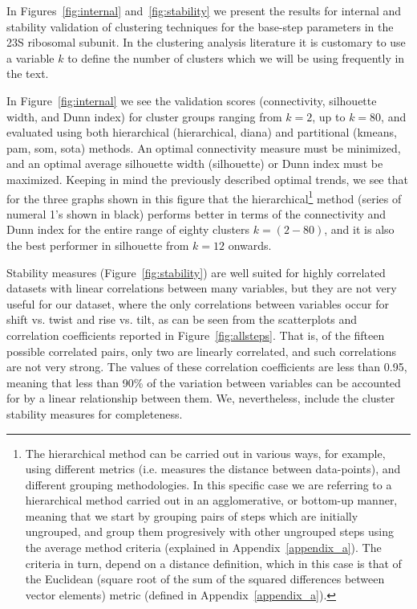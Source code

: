 In  Figures~\ref{fig:internal} and~\ref{fig:stability} we  present the
results for internal and stability validation of clustering techniques
for the  base-step parameters  in the 23S  ribosomal subunit.   In the
clustering analysis literature  it is customary to use  a variable $k$
to define the number of clusters  which we will be using frequently in
the text.

In   Figure~\ref{fig:internal}   we    see   the   validation   scores
(connectivity, silhouette  width, and  Dunn index) for  cluster groups
ranging  from   $k=2$,  up  to  $k=80$,  and   evaluated  using  both
hierarchical (hierarchical, diana)  and partitional (kmeans, pam, som,
sota) methods. An optimal  connectivity measure must be minimized, and
an optimal average silhouette width (silhouette) or Dunn index must be
maximized.  Keeping  in mind the previously  described optimal trends,
we  see that  for  the three  graphs  shown in  this  figure that  the
hierarchical\footnote{The  hierarchical method can  be carried  out in
  various ways,  for example, using different  metrics (i.e.  measures
  the   distance   between   data-points),  and   different   grouping
  methodologies.   In  this  specific  case  we  are  referring  to  a
  hierarchical method  carried out  in an agglomerative,  or bottom-up
  manner, meaning that  we start by grouping pairs  of steps which are
  initially  ungrouped,   and  group  them   progresively  with  other
  ungrouped  steps using  the  average method  criteria (explained  in
  Appendix~\ref{appendix_a}).  The  criteria  in  turn,  depend  on  a
  distance definition,  which in  this case is  that of  the Euclidean
  (square root  of the sum  of the squared differences  between vector
  elements)  metric (defined  in  Appendix~\ref{appendix_a}).}  method
(series of numeral 1's shown in black) performs better in terms of the
connectivity and  Dunn index for  the entire range of  eighty clusters
$k=(2-80)$,  and it  is also  the  best performer  in silhouette  from
$k=12$ onwards.

Stability  measures (Figure~\ref{fig:stability})  are well  suited for
highly  correlated  datasets  with  linear correlations  between  many
variables, but  they are  not very useful  for our dataset,  where the
only correlations between variables occur for shift vs. twist and rise
vs.   tilt, as  can  be  seen from  the  scatterplots and  correlation
coefficients reported  in Figure~\ref{fig:allsteps}.  That  is, of the
fifteen possible  correlated pairs, only two  are linearly correlated,
and  such correlations  are  not  very strong.   The  values of  these
correlation coefficients  are less than  0.95, meaning that  less than
90\%  of the variation  between variables  can be  accounted for  by a
linear  relationship  between  them.   We, nevertheless,  include  the
cluster stability measures for completeness.

